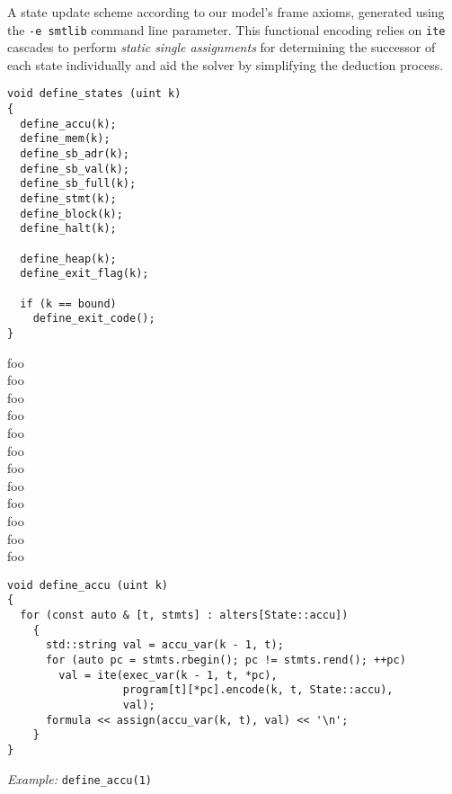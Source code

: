 A state update scheme according to our model's frame axioms, generated using the \texttt{-e smtlib} command line parameter.
This functional encoding relies on \texttt{ite} cascades to perform \emph{static single assignments} for determining the successor of each state individually and aid the solver by simplifying the deduction process.

\begin{lstlisting}[style=c++]
void define_states (uint k)
{
  define_accu(k);
  define_mem(k);
  define_sb_adr(k);
  define_sb_val(k);
  define_sb_full(k);
  define_stmt(k);
  define_block(k);
  define_halt(k);

  define_heap(k);
  define_exit_flag(k);

  if (k == bound)
    define_exit_code();
}
\end{lstlisting}


\noindent
foo\\
foo\\
foo\\
foo\\
foo\\
foo\\
foo\\
foo\\
foo\\
foo\\
foo\\
foo

\begin{lstlisting}[style=c++]
void define_accu (uint k)
{
  for (const auto & [t, stmts] : alters[State::accu])
    {
      std::string val = accu_var(k - 1, t);
      for (auto pc = stmts.rbegin(); pc != stmts.rend(); ++pc)
        val = ite(exec_var(k - 1, t, *pc),
                  program[t][*pc].encode(k, t, State::accu),
                  val);
      formula << assign(accu_var(k, t), val) << '\n';
    }
}
\end{lstlisting}

\noindent
\emph{Example:} \lstinline[style=c++]{define_accu(1)}

